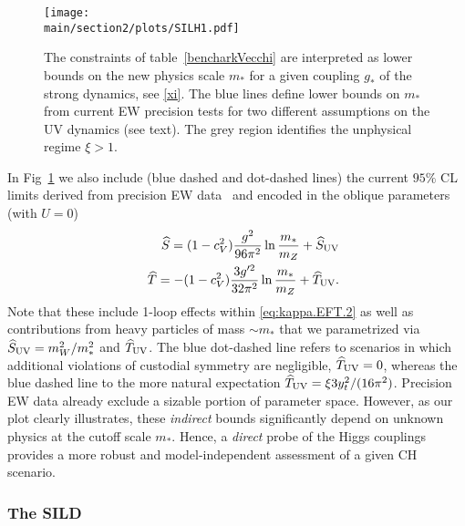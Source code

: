 \begin{figure}[t]
\begin{center}
\texttt{[image: \\main/section2/plots/SILH1.pdf]}
\caption{The constraints of table~\ref{bencharkVecchi} are interpreted as lower bounds on the new physics scale $m_*$ for a given coupling $g_*$ of the strong dynamics, see \eqref{xi}. The blue lines define lower bounds on $m_*$ from current EW precision tests for two different assumptions on the UV dynamics (see text). The grey region identifies the unphysical regime $\xi>1$. 
}\label{SILH}
\end{center}
\end{figure}



In Fig~\ref{SILH} we also include (blue dashed and dot-dashed lines) the current $95\%$ CL limits derived from precision EW data~\cite{Baak:2014ora} and encoded in the oblique parameters (with $U=0$)
\begin{eqnarray}
&&{\widehat S}=(1-c_V^2)\frac{g^2}{96\pi^2}\ln\frac{m_*}{m_Z}+{\widehat S}_{\rm UV}%
\\\nonumber
&&{\widehat T}=-(1-c_V^2)\frac{3g'^2}{32\pi^2}\ln\frac{m_*}{m_Z}+{\widehat T}_{\rm UV}.%
\end{eqnarray}
Note that these include 1-loop effects within \eqref{eq:kappa.EFT.2} as well as contributions from heavy particles of mass $\sim m_*$ that we parametrized via $\widehat S_{\rm UV}={m_W^2}/{m_*^2}$ and $\widehat T_{\rm UV}$. The blue dot-dashed line refers to scenarios in which additional violations of custodial symmetry are negligible, $\widehat T_{\rm UV}=0$, whereas the blue dashed line to the more natural expectation $\widehat T_{\rm UV}=\xi 3y_t^2/(16\pi^2)$. Precision EW data already exclude a sizable portion of parameter space. However, as our plot clearly illustrates, these {\emph{indirect}} bounds significantly depend on unknown physics at the cutoff scale $m_*$. Hence, a {\emph{direct}} probe of the Higgs couplings provides a more robust and model-independent assessment of a given CH scenario.








\subsubsection*{The SILD}

